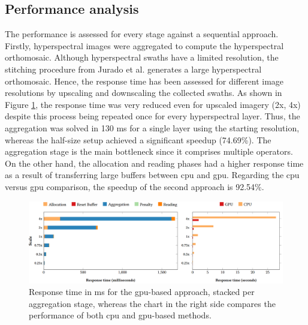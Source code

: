 \subsection{Performance analysis}

The performance is assessed for every stage against a sequential approach. Firstly, hyperspectral images were aggregated to compute the hyperspectral orthomosaic. Although hyperspectral swaths have a limited resolution, the stitching procedure from Jurado et al. \cite{jurado_efficient_2022} generates a large hyperspectral orthomosaic. Hence, the response time has been assessed for different image resolutions by upscaling and downscaling the collected swaths. As shown in Figure \ref{fig:hyper_aggregation_results}, the response time was very reduced even for upscaled imagery (2x, 4x) despite this process being repeated once for every hyperspectral layer. Thus, the aggregation was solved in 130 \si{\milli\second} for a single layer using the starting resolution, whereas the half-size setup achieved a significant speedup (74.69\%). The aggregation stage is the main bottleneck since it comprises multiple operators. On the other hand, the allocation and reading phases had a higher response time as a result of transferring large buffers between \acrshort{cpu} and \acrshort{gpu}. Regarding the \acrshort{cpu} versus \acrshort{gpu} comparison, the speedup of the second approach is 92.54\%.

\begin{figure}[bt]
    \centering
    \includegraphics[width=\linewidth]{figs/hyper_point_cloud/hyper_aggregation_performance.png}
    \caption{Response time in \si{\milli\second} for the \acrshort{gpu}-based approach, stacked per aggregation stage, whereas the chart in the right side compares the performance of both \acrshort{cpu} and \acrshort{gpu}-based methods.}
    \label{fig:hyper_aggregation_results}
\end{figure}


